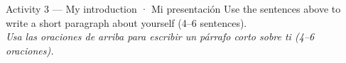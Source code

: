 \vspace{14pt}

\begin{activity}{Activity 3 — My introduction · Mi presentación}
Use the sentences above to write a short paragraph about yourself (4--6 sentences). \\
\textit{Usa las oraciones de arriba para escribir un párrafo corto sobre ti (4--6 oraciones).}

\writinglines[8]
\end{activity}
